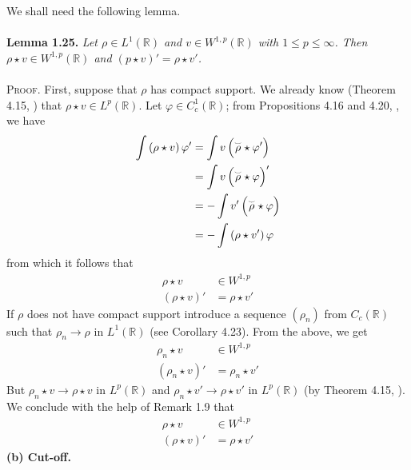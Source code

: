 \documentclass[a4paper,oneside]{article}
\numberwithin{equation}{section}
\begin{document}
We shall need the following lemma.\\
\\
\textbf{Lemma 1.25.} \textit{Let $\rho \in L^1\left(\mathbb{R}\right)$ and $v\in W^{1,p}\left(\mathbb{R}\right)$ with $1\le p\le \infty$. Then $\rho \star v \in W^{1,p}\left(\mathbb{R}\right)$ and $\left(p\star v\right)'=\rho \star v'$.}\\
\\
\textsc{Proof.} First, suppose that $\rho$ has compact support. We already know (Theorem 4.15, \cite{1}) that $\rho \star v\in L^p\left(\mathbb{R}\right)$. Let $\varphi \in C_c^1\left(\mathbb{R}\right)$; from Propositions 4.16 and 4.20, \cite{1}, we have
\begin{align}
\int {\left( {\rho \star v} \right)\varphi '}  &= \int {v\left( {\mathord{\buildrel{\lower3pt\hbox{$\scriptscriptstyle\smile$}} 
\over \rho } \star \varphi '} \right)} \\
 &= \int {v\left( {\mathord{\buildrel{\lower3pt\hbox{$\scriptscriptstyle\smile$}} 
\over \rho } \star \varphi } \right)'} \\
& =  - \int {v'\left( {\mathord{\buildrel{\lower3pt\hbox{$\scriptscriptstyle\smile$}} 
\over \rho } \star \varphi } \right)} \\
& =  - \int {\left( {\rho \star v'} \right)\varphi } 
\end{align}
from which it follows that
\begin{align}
\rho \star v &\in {W^{1,p}}\\
\left( {\rho \star v} \right)' &= \rho \star v'
\end{align}
If $\rho$ does not have compact support introduce a sequence $\left(\rho _n\right)$ from $C_c\left(\mathbb{R}\right)$ such that $\rho _n\to \rho $ in $L^1\left(\mathbb{R}\right)$ (see Corollary 4.23). From the above, we get
\begin{align}
\rho _n\star v &\in {W^{1,p}}\\
\left( {\rho _n \star v} \right)' &= \rho _n \star v'
\end{align}
But $\rho _n\star v \to \rho \star v$ in $L^p\left(\mathbb{R}\right)$ and $\rho _n\star v' \to \rho \star v'$ in $L^p\left(\mathbb{R}\right)$ (by Theorem 4.15, \cite{1}). We conclude with the help of Remark 1.9 that
\begin{align}
\rho \star v &\in {W^{1,p}}\\
\left( {\rho \star v} \right)' &= \rho \star v'
\end{align}
\textbf{(b) Cut-off.}
\end{document}
